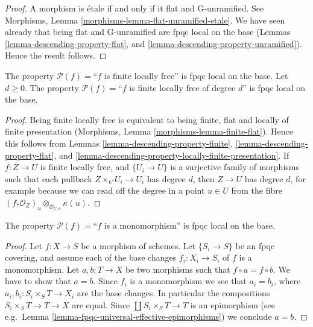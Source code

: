 \begin{proof}
A morphism is \'etale if and only if it flat and G-unramified.
See Morphisms, Lemma \ref{morphisms-lemma-flat-unramified-etale}.
We have seen already that being flat and G-unramified
are fpqc local on the base (Lemmas
\ref{lemma-descending-property-flat}, and
\ref{lemma-descending-property-unramified}).
Hence the result follows.
\end{proof}

\begin{lemma}
\label{lemma-descending-property-finite-locally-free}
The property $\mathcal{P}(f) =$``$f$ is finite locally free''
is fpqc local on the base.
Let $d \geq 0$.
The property $\mathcal{P}(f) =$``$f$ is finite locally free of degree $d$''
is fpqc local on the base.
\end{lemma}

\begin{proof}
Being finite locally free is equivalent to being
finite, flat and locally of finite presentation
(Morphisms, Lemma \ref{morphisms-lemma-finite-flat}).
Hence this follows from Lemmas
\ref{lemma-descending-property-finite},
\ref{lemma-descending-property-flat}, and
\ref{lemma-descending-property-locally-finite-presentation}.
If $f : Z \to U$ is finite locally free, and $\{U_i \to U\}$ is a surjective
family of morphisms such that each pullback $Z \times_U U_i \to U_i$ has
degree $d$, then $Z \to U$ has degree $d$, for example because we
can read off the degree in a point $u \in U$ from the fibre
$(f_*\mathcal{O}_Z)_u \otimes_{\mathcal{O}_{U, u}} \kappa(u)$.
\end{proof}

\begin{lemma}
\label{lemma-descending-property-monomorphism}
The property $\mathcal{P}(f) =$``$f$ is a monomorphism''
is fpqc local on the base.
\end{lemma}

\begin{proof}
Let $f : X \to S$ be a morphism of schemes.
Let $\{S_i \to S\}$ be an fpqc covering, and assume
each of the base changes $f_i : X_i \to S_i$ of $f$ is
a monomorphism. Let $a, b : T \to X$ be two morphisms
such that $f \circ a = f \circ b$. We have to show that $a = b$.
Since $f_i$ is a monomorphism we see that $a_i = b_i$, where
$a_i, b_i : S_i \times_S T \to X_i$ are
the base changes. In particular the compositions
$S_i \times_S T \to T \to X$ are equal.
Since $\coprod S_i \times_S T \to T$
is an epimorphism (see
e.g.\ Lemma \ref{lemma-fpqc-universal-effective-epimorphisms})
we conclude $a = b$.
\end{proof}

